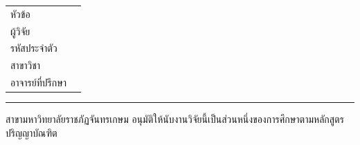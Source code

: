 

\noindent\begin{tabularx}{\linewidth}{@{}l@{\qquad}X@{}}
	หัวข้อ\@typeofwritingThai & \parbox[t]{\linewidth}{\strut\@thesistitleforabstractThai\\ \@thesistitleforabstract\strut}\\
	ผู้วิจัย & \@authorThai\\
	รหัสประจำตัว & \@cruStudentId\\
	สาขาวิชา & \@majorThai\\
	อาจารย์ที่ปรึกษา & \@advisorThai\\	

\end{tabularx}\newline

\par\noindent\rule{\textwidth}{0.4pt}

\indent สาขา\ifdefined\@majorThai \@majorThai\fi \space \ifdefined\@facultyThai \@facultyThai\space \fi มหาวิทยาลัยราชภัฏจันทรเกษม 
อนุมัติให้นับงานวิจัยนี้เป็นส่วนหนึ่งของการศึกษาตามหลักสูตรปริญญาบัณฑิต \\[10mm]


\parbox[t]{0.5\linewidth}{\centering\hrulefill\\\vspace{-2mm}\makebox[\linewidth][c]{(\@majorhead)}}
 \\[10mm]

 \\[10mm]

\parbox[t]{0.5\linewidth}{\centering\hrulefill\\\vspace{-2mm}\makebox[\linewidth][c]{(\@chairman)}}
 \\[10mm]

\parbox[t]{0.5\linewidth}{\centering\hrulefill\\\vspace{-2mm}\makebox[\linewidth][c]{(\@memberone)}}
 \\[10mm]

